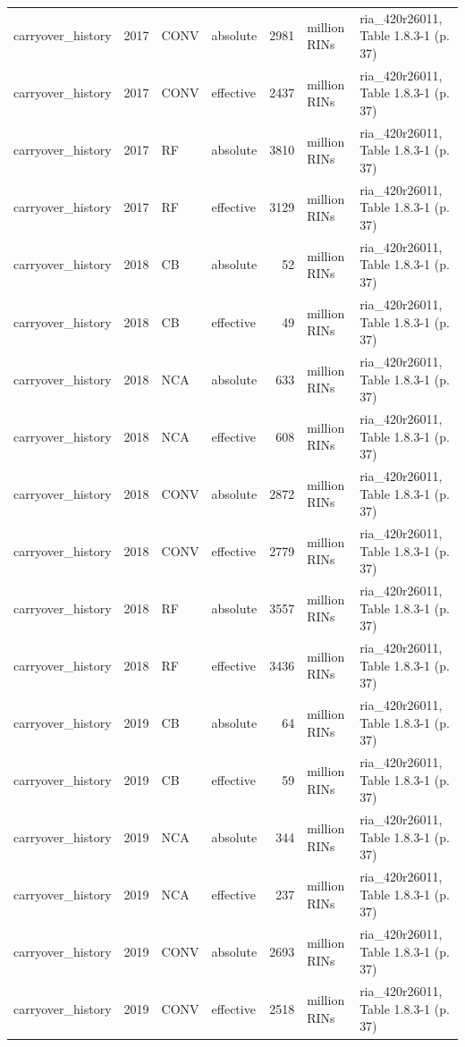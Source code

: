 \begin{longtable}{p{2.3cm}p{0.7cm}p{1.0cm}p{2.6cm}rp{1.7cm}p{4.6cm}}
carryover\_history & 2017 & CONV & absolute & 2981 & million RINs & ria\_420r26011, Table 1.8.3-1 (p. 37) \\
carryover\_history & 2017 & CONV & effective & 2437 & million RINs & ria\_420r26011, Table 1.8.3-1 (p. 37) \\
carryover\_history & 2017 & RF & absolute & 3810 & million RINs & ria\_420r26011, Table 1.8.3-1 (p. 37) \\
carryover\_history & 2017 & RF & effective & 3129 & million RINs & ria\_420r26011, Table 1.8.3-1 (p. 37) \\
carryover\_history & 2018 & CB & absolute & 52 & million RINs & ria\_420r26011, Table 1.8.3-1 (p. 37) \\
carryover\_history & 2018 & CB & effective & 49 & million RINs & ria\_420r26011, Table 1.8.3-1 (p. 37) \\
carryover\_history & 2018 & NCA & absolute & 633 & million RINs & ria\_420r26011, Table 1.8.3-1 (p. 37) \\
carryover\_history & 2018 & NCA & effective & 608 & million RINs & ria\_420r26011, Table 1.8.3-1 (p. 37) \\
carryover\_history & 2018 & CONV & absolute & 2872 & million RINs & ria\_420r26011, Table 1.8.3-1 (p. 37) \\
carryover\_history & 2018 & CONV & effective & 2779 & million RINs & ria\_420r26011, Table 1.8.3-1 (p. 37) \\
carryover\_history & 2018 & RF & absolute & 3557 & million RINs & ria\_420r26011, Table 1.8.3-1 (p. 37) \\
carryover\_history & 2018 & RF & effective & 3436 & million RINs & ria\_420r26011, Table 1.8.3-1 (p. 37) \\
carryover\_history & 2019 & CB & absolute & 64 & million RINs & ria\_420r26011, Table 1.8.3-1 (p. 37) \\
carryover\_history & 2019 & CB & effective & 59 & million RINs & ria\_420r26011, Table 1.8.3-1 (p. 37) \\
carryover\_history & 2019 & NCA & absolute & 344 & million RINs & ria\_420r26011, Table 1.8.3-1 (p. 37) \\
carryover\_history & 2019 & NCA & effective & 237 & million RINs & ria\_420r26011, Table 1.8.3-1 (p. 37) \\
carryover\_history & 2019 & CONV & absolute & 2693 & million RINs & ria\_420r26011, Table 1.8.3-1 (p. 37) \\
carryover\_history & 2019 & CONV & effective & 2518 & million RINs & ria\_420r26011, Table 1.8.3-1 (p. 37) \\

\end{longtable}
